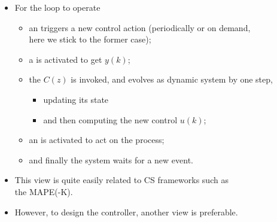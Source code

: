 \begin{frame}
\myPause
 \begin{itemize}[<+-| alert@+>]
 \item For the loop to operate
       \begin{itemize}[<+-| alert@+>]
       \item an  triggers a new control action (periodically or on demand,\\
             here we stick to the former case);
       \item a  is activated to get $y(k)$;
       \item the  $C(z)$ is invoked, and evolves as dynamic system by one step,
             \begin{itemize}[<+-| alert@+>]
             \item updating its state
             \item and then computing the new control $u(k)$;
             \end{itemize}
       \item an  is activated to act on the process;
       \item and finally the system waits for a new event.
       \end{itemize}
 \item \vfill This view is quite easily related to CS frameworks such as\\
       the MAPE(-K).
 \item However, to design the controller, another view is preferable.
 \end{itemize}
\end{frame}

